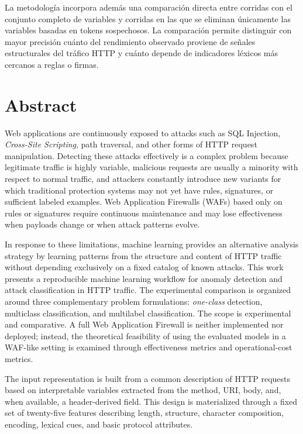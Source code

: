 \documentclass[12pt,oneside]{report}
\begin{document}
La metodología incorpora además una comparación directa entre corridas con el conjunto completo de variables y corridas en las que se eliminan únicamente las variables basadas en tokens sospechosos. La comparación permite distinguir con mayor precisión cuánto del rendimiento observado proviene de señales estructurales del tráfico HTTP y cuánto depende de indicadores léxicos más cercanos a reglas o firmas.

\chapter*{Abstract}
Web applications are continuously exposed to attacks such as SQL Injection, \textit{Cross-Site Scripting}, path traversal, and other forms of HTTP request manipulation. Detecting these attacks effectively is a complex problem because legitimate traffic is highly variable, malicious requests are usually a minority with respect to normal traffic, and attackers constantly introduce new variants for which traditional protection systems may not yet have rules, signatures, or sufficient labeled examples. Web Application Firewalls (WAFs) based only on rules or signatures require continuous maintenance and may lose effectiveness when payloads change or when attack patterns evolve.

In response to these limitations, machine learning provides an alternative analysis strategy by learning patterns from the structure and content of HTTP traffic without depending exclusively on a fixed catalog of known attacks. This work presents a reproducible machine learning workflow for anomaly detection and attack classification in HTTP traffic. The experimental comparison is organized around three complementary problem formulations: \textit{one-class} detection, multiclass classification, and multilabel classification. The scope is experimental and comparative. A full Web Application Firewall is neither implemented nor deployed; instead, the theoretical feasibility of using the evaluated models in a WAF-like setting is examined through effectiveness metrics and operational-cost metrics.

The input representation is built from a common description of HTTP requests based on interpretable variables extracted from the method, URI, body, and, when available, a header-derived field. This design is materialized through a fixed set of twenty-five features describing length, structure, character composition, encoding, lexical cues, and basic protocol attributes.
\end{document}
